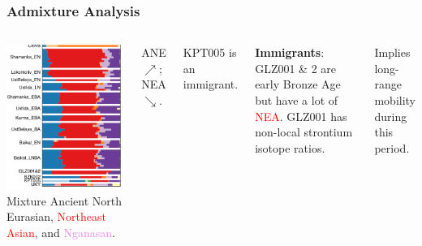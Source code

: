 \documentclass[pdftex,12pt,dvipsnames]{beamer}
\begin{document}
\begin{frame}
  \frametitle{Admixture Analysis}
  \begin{columns}
    \includegraphics[width=1.1\linewidth]{yu20-struct.png}
    \raggedleft
    Mixture \textcolor{NavyBlue}{Ancient North Eurasian},
    \textcolor{red}{Northeast Asian}, and
    \textcolor{violet}{Nganasan}.

    \bigskip

    ANE $\nearrow$; NEA $\searrow$.

    \bigskip

    KPT005 is an immigrant.

    \bigskip

    \textbf{Immigrants}: GLZ001 \& 2 are early Bronze Age but have a
    lot of \textcolor{red}{NEA}. GLZ001 has non-local strontium
    isotope ratios.

    \bigskip

   Implies long-range mobility during this period.
  \end{columns}
\end{frame}
\end{document}
